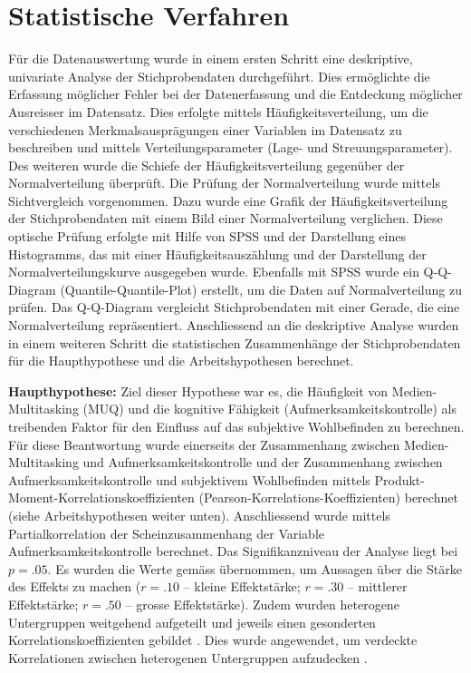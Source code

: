 \section{Statistische Verfahren}\label{section.statistischeVerfahren}
Für die Datenauswertung wurde in einem ersten Schritt eine deskriptive, univariate Analyse der Stichprobendaten durchgeführt. Dies ermöglichte die Erfassung möglicher Fehler bei der Datenerfassung und die Entdeckung möglicher Ausreisser im Datensatz. Dies erfolgte mittels Häufigkeitsverteilung, um die verschiedenen Merkmalsausprägungen einer Variablen im Datensatz zu beschreiben und mittels Verteilungsparameter (Lage- und Streuungsparameter). Des weiteren wurde die Schiefe der Häufigkeitsverteilung gegenüber der Normalverteilung überprüft. Die Prüfung der Normalverteilung wurde mittels Sichtvergleich vorgenommen. Dazu wurde eine Grafik der Häufigkeitsverteilung der Stichprobendaten mit einem Bild einer Normalverteilung verglichen. Diese optische Prüfung erfolgte mit Hilfe von SPSS und der Darstellung eines Histogramms, das mit einer Häufigkeitsauszählung und der Darstellung der Normalverteilungskurve ausgegeben wurde. Ebenfalls mit SPSS wurde ein Q-Q-Diagram (Quantile-Quantile-Plot) erstellt, um die Daten auf Normalverteilung zu prüfen. Das Q-Q-Diagram vergleicht Stichprobendaten mit einer Gerade, die eine Normalverteilung repräsentiert. Anschliessend an die deskriptive Analyse wurden in einem weiteren Schritt die statistischen Zusammenhänge der Stichprobendaten für die Haupthypothese und die Arbeitshypothesen berechnet. 
\par 
\textbf{Haupthypothese:} Ziel dieser Hypothese war es, die Häufigkeit von Medien-Multitasking (MUQ) und die kognitive Fähigkeit (Aufmerksamkeitskontrolle) als treibenden Faktor für den Einfluss auf das subjektive Wohlbefinden zu berechnen. Für diese Beantwortung wurde einerseits der Zusammenhang zwischen Medien-Multitasking und Aufmerksamkeitskontrolle und der Zusammenhang zwischen Aufmerksamkeitskontrolle und subjektivem Wohlbefinden mittels Produkt-Moment-Korrelationskoeffizienten (Pearson-Korrelations-Koeffizienten) berechnet (siehe Arbeitshypothesen weiter unten). Anschliessend wurde mittels Partialkorrelation der Scheinzusammenhang der Variable Aufmerksamkeitskontrolle berechnet. Das Signifikanzniveau der Analyse liegt bei $p=.05$. Es wurden die Werte gemäss \cite{Cohen1988} übernommen, um Aussagen über die Stärke des Effekts zu machen ($r=.10$ -- kleine Effektstärke; $r=.30$ -- mittlerer Effektstärke; $r=.50$ -- grosse Effektstärke). Zudem wurden heterogene Untergruppen weitgehend aufgeteilt und jeweils einen gesonderten Korrelationskoeffizienten gebildet \cite{Renkewitz2008}. Dies wurde angewendet, um verdeckte Korrelationen zwischen heterogenen Untergruppen aufzudecken \cite{Ebermann2014}.
